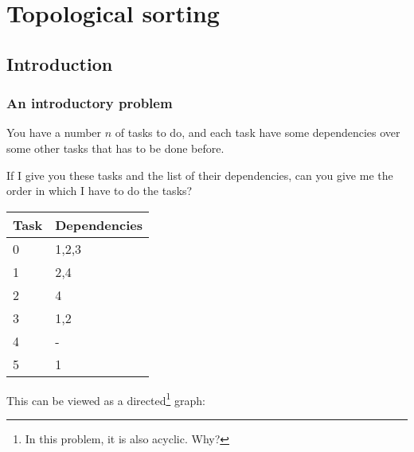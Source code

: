 \section{Topological sorting}

\subsection{Introduction}

\subsubsection{An introductory problem}
You have a number $n$ of tasks to do, and each task have some dependencies over some other tasks that has to be done before.

If I give you these tasks and the list of their dependencies, can you give me the order in which I have to do the tasks?

\begin{center}
  \begin{tabular}{|l|l|}
  \hline
  \textbf{Task} & \textbf{Dependencies}\\
  \hline
  0 & 1,2,3\\
  1 & 2,4\\
  2 & 4\\
  3 & 1,2\\
  4 & -\\
  5 & 1\\
  \hline
  \end{tabular}
\end{center}

This can be viewed as a directed\footnote{In this problem, it is also acyclic. Why?} graph:

\begin{center}
\end{center}

